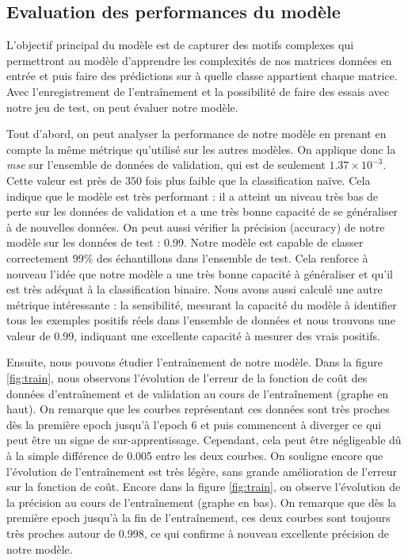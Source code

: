 \documentclass[11pt, parskip=half]{scrartcl} %
\begin{document}
\subsection{Evaluation des performances du modèle}
L’objectif principal du modèle est de capturer des motifs complexes qui permettront au modèle d’apprendre les complexités de nos matrices données en entrée et puis faire des prédictions sur à quelle classe appartient chaque matrice. Avec l’enregistrement de l’entraînement et la possibilité de faire des essais avec notre jeu de test, on peut évaluer notre modèle.

Tout d’abord, on peut analyser la performance de notre modèle en prenant en compte la même métrique qu'utilisé sur les autres modèles. On applique donc la \textit{mse} sur l’ensemble de données de validation, qui est de seulement $1.37\times 10^{-3}$. Cette valeur est près de $350$ fois plus faible que la classification naïve. Cela indique que le modèle est très performant : il a atteint un niveau très bas de perte sur les données de validation et a une très bonne capacité de se généraliser à de nouvelles données. On peut aussi vérifier la précision (accuracy) de notre modèle sur les données de test : 0.99. Notre modèle est capable de classer correctement 99\% des échantillons dans l’ensemble de test. Cela renforce à nouveau l’idée que notre modèle a une très bonne capacité à généraliser et qu’il est très adéquat à la classification binaire. Nous avons aussi calculé une autre métrique intéressante : la sensibilité, mesurant la capacité du modèle à identifier tous les exemples positifs réels dans l'ensemble de données et nous trouvons une valeur de 0.99, indiquant une excellente capacité à mesurer des vrais positifs.

Ensuite, nous pouvons étudier l’entraînement de notre modèle. Dans la figure \ref{fig:train}, nous observons l’évolution de l’erreur de la fonction de coût des données d’entraînement et de validation au cours de l’entraînement (graphe en haut). On remarque que les courbes représentant ces données sont très proches dès la première epoch jusqu’à l’epoch 6 et puis commencent à diverger ce qui peut être un signe de sur-apprentissage. Cependant, cela peut être négligeable dû à la simple différence de 0.005 entre les deux courbes. On souligne encore que l’évolution de l’entraînement est très légère, sans grande amélioration de l’erreur sur la fonction de coût. Encore dans la figure \ref{fig:train}, on observe l’évolution de la précision au cours de l’entraînement (graphe en bas). On remarque que dès la première epoch jusqu’à la fin de l’entraînement, ces deux courbes sont toujours très proches autour de 0.998, ce qui confirme à nouveau excellente précision de notre modèle.
\end{document}
